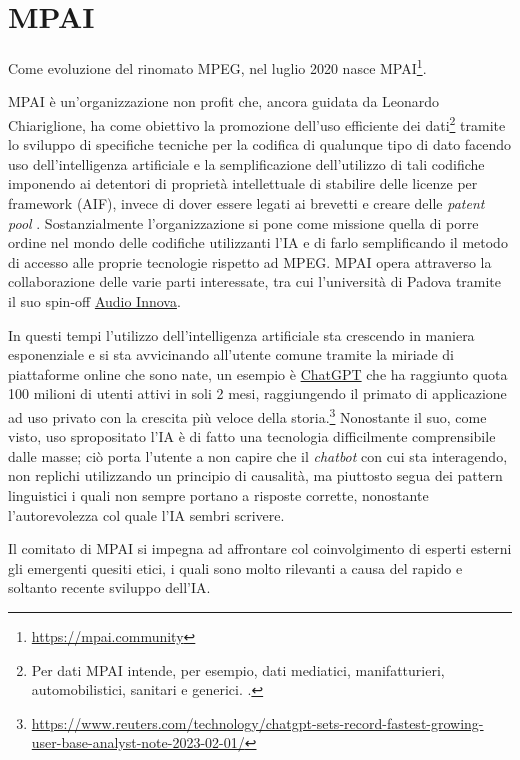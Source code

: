 
\chapter{MPAI} \label{chp:mpai}
Come evoluzione del rinomato \ac{MPEG}, nel luglio 2020 nasce \ac{MPAI}\footnote{\url{https://mpai.community}}.

\ac{MPAI} è un'organizzazione non profit che, ancora guidata da Leonardo Chiariglione, ha come obiettivo la promozione dell'uso efficiente dei dati\footnote{Per dati \ac{MPAI} intende, per esempio, dati mediatici, manifatturieri, automobilistici, sanitari e generici. \cite{mpaiMPAICommunity}.} tramite lo sviluppo di specifiche tecniche per la codifica di qualunque tipo di dato facendo uso dell'intelligenza artificiale e la semplificazione dell'utilizzo di tali codifiche imponendo ai detentori di proprietà intellettuale di stabilire delle licenze per framework (\acs{AIF}), invece di dover essere legati ai brevetti e creare delle \textit{patent pool} \cite{mpaiMPAICommunity}. Sostanzialmente l'organizzazione si pone come missione quella di porre ordine nel mondo delle codifiche utilizzanti l'IA e di farlo semplificando il metodo di accesso alle proprie tecnologie rispetto ad \ac{MPEG}.
\ac{MPAI} opera attraverso la collaborazione delle varie parti interessate, tra cui l'università di Padova tramite il suo spin-off \href{www.audioinnova.com}{Audio Innova}.

In questi tempi l'utilizzo dell'intelligenza artificiale sta crescendo in maniera esponenziale e si sta avvicinando all'utente comune tramite la miriade di piattaforme online che sono nate, un esempio è \href{https://chat.openai.com}{ChatGPT} che ha raggiunto quota 100 milioni di utenti attivi in soli 2 mesi, raggiungendo il primato di applicazione ad uso privato con la crescita più veloce della storia.\footnote{\url{https://www.reuters.com/technology/chatgpt-sets-record-fastest-growing-user-base-analyst-note-2023-02-01/}} Nonostante il suo, come visto, uso spropositato l'IA è di fatto una tecnologia difficilmente comprensibile dalle masse; ciò porta l'utente a non capire che il \textit{chatbot} con cui sta interagendo, non replichi utilizzando un principio di causalità, ma piuttosto segua dei pattern linguistici i quali non sempre portano a risposte corrette, nonostante l'autorevolezza col quale l'IA sembri scrivere.

Il comitato di \ac{MPAI} si impegna ad affrontare col coinvolgimento di esperti esterni gli emergenti quesiti etici, i quali sono molto rilevanti a causa del rapido e soltanto recente sviluppo dell'IA.

